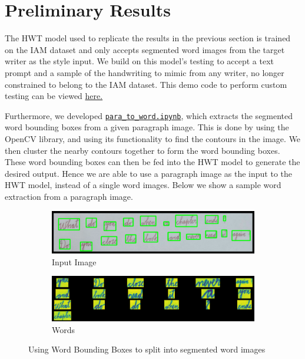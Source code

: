 \documentclass[10pt,twocolumn,letterpaper]{article}
\begin{document}
\section{Preliminary Results}\label{prelim-results}
The HWT model used to replicate the results in the previous section is trained on the IAM dataset \cite{IAM} and only accepts segmented word images from the target writer as the style input. We build on this model's testing to accept a text prompt and a sample of the handwriting to mimic from any writer, no longer constrained to belong to the IAM dataset. This demo code to perform custom testing can be viewed \href{https://github.com/Shambu-K/handwriting-generator-model/blob/main/demo-hwt.ipynb}{here.}

Furthermore, we developed \href{https://github.com/Shambu-K/handwriting-generator-model/blob/main/Code/para_to_words.ipynb}{\texttt{para\_to\_word.ipynb}}, which extracts the segmented word bounding boxes from a given paragraph image. This is done by using the OpenCV library, and using its functionality to find the contours in the image. We then cluster the nearby contours together to form the word bounding boxes. These word bounding boxes can then be fed into the HWT model to generate the desired output. Hence we are able to use a paragraph image as the input to the HWT model, instead of a single word images. Below we show a sample word extraction from a paragraph image. 
\begin{figure}[h]
  \centering
  \begin{subfigure}[b]{0.4\textwidth}
    \includegraphics[width=\textwidth]{../latex-src/Images/Bounding_Box_Image.png}
    \caption{Input Image}
    \label{fig:bb_img}
  \end{subfigure}
  \hfill
  \begin{subfigure}[b]{0.4\textwidth}
    \includegraphics[width=\textwidth]{../latex-src/Images/Bounding_Box_Words.png}
    \caption{Words}
    \label{fig:bb_words}
  \end{subfigure}
  \caption{{Using Word Bounding Boxes to split into segmented word images}}
  \label{fig:bb}
\end{figure}
\end{document}
